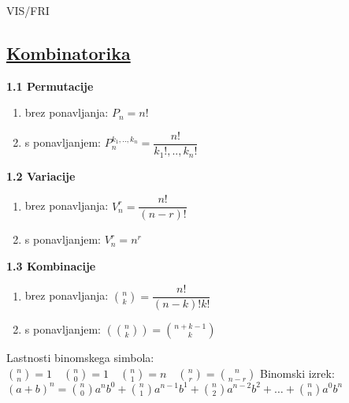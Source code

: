 \documentclass{article}
\begin{document}
\begin{center}
    {\small VIS/FRI \par}
\end{center}

\begin{multicols}{3}



\section{\underline{Kombinatorika}}


\textbf{1.1 Permutacije}
\begin{small}
    \begin{enumerate}
        \item brez ponavljanja: $P_{n} = n!$
        \item s ponavljanjem: $P_{n}^{k_{1},..,k_{n}} = \dfrac{n!}{k_{1}!,..,k_{n}!}$
    \end{enumerate}        
\end{small}

\textbf{1.2 Variacije}
    \begin{small}
        \begin{enumerate}
            \item brez ponavljanja: $V_{n}^{r} = \dfrac{n!}{(n - r)!}$
            \item s ponavljanjem: $V_{n}^{r} = n^{r}$
        \end{enumerate}                
    \end{small}

\textbf{1.3 Kombinacije}
\begin{small}
    \begin{enumerate}
        \item brez ponavljanja: ${n\choose k} = \dfrac{n!}{(n - k)! k!}$
        \item s ponavljanjem: $({n\choose k}) = {n + k - 1\choose k}$
    \end{enumerate}
    \begin{center}
        Lastnosti binomskega simbola:
        \begin{math}
            {n \choose n} = 1 \quad
            {n \choose 0} = 1 \quad
            {n \choose 1} = n \quad
            {n \choose r} = {n \choose n - r} 
        \end{math}
        Binomski izrek:\\
        \begin{math}
            (a + b)^{n} =
            {n \choose 0} a^{n} b^{0} + {n \choose 1} a^{n - 1} b^{1} +
            {n \choose 2} a^{n - 2} b^{2} + \dots + {n \choose n} a^{0} b^{n}
        \end{math}
    

\end{center}
\end{small}
\end{multicols}
\end{document}

